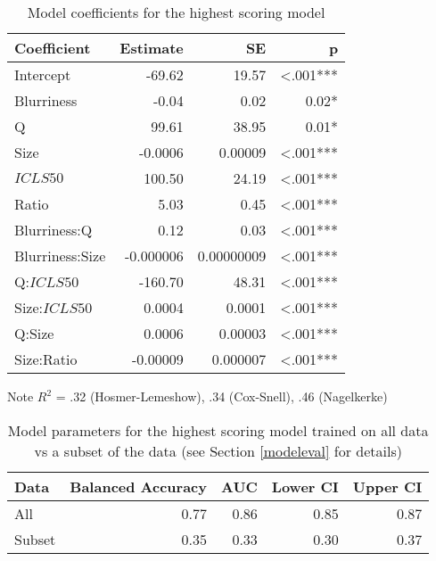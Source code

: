 \documentclass[12pt]{article}
\begin{document}
\begin{table}[ht]
	\caption{Model coefficients for the highest scoring model}
	\begin{center}
	\begin{tabular}{lrrr}
		\toprule
		Coefficient & Estimate & SE & p \\ 
		\midrule
		Intercept & -69.62 & 19.57 & \textless .001***\\
		Blurriness & -0.04 & 0.02 & 0.02*\\
		Q & 99.61 & 38.95 &  0.01*\\
		Size & -0.0006 & 0.00009 & \textless .001***\\
		$ICLS50$ & 100.50 & 24.19 & \textless .001***\\
		Ratio & 5.03 & 0.45 & \textless .001***\\
		Blurriness:Q & 0.12 & 0.03 & \textless .001***\\
		Blurriness:Size & -0.000006 & 0.00000009 & \textless .001***\\
		Q:$ICLS50$ & -160.70 & 48.31 & \textless .001*** \\
		Size:$ICLS50$ &  0.0004 & 0.0001 & \textless .001***\\
		Q:Size &  0.0006 & 0.00003 &  \textless .001*** \\
		Size:Ratio & -0.00009 & 0.000007 & \textless .001*** \\ 
		\bottomrule
	\end{tabular}
	\begin{tablenotes}
		Note $R^2$ = .32 (Hosmer-Lemeshow), .34 (Cox-Snell), .46 (Nagelkerke)
	\end{tablenotes}
	\end{center}
	\label{tab:CVtopmodel}
\end{table}

\begin{table}[ht]
	\centering
	\caption{Model parameters for the highest scoring model trained on all data vs a subset of the data (see Section \ref{modeleval} for details)}
	\begin{tabular}{lrrrr}
	  \toprule
	Data & Balanced Accuracy & AUC & Lower CI & Upper CI \\ 
	  \midrule
	All & 0.77 & 0.86 & 0.85 & 0.87 \\
	Subset & 0.35 & 0.33 & 0.30 & 0.37 \\ 
	   \bottomrule
	\end{tabular}
	\label{tab:NarsvsThul}
\end{table}

\clearpage
\end{document}
